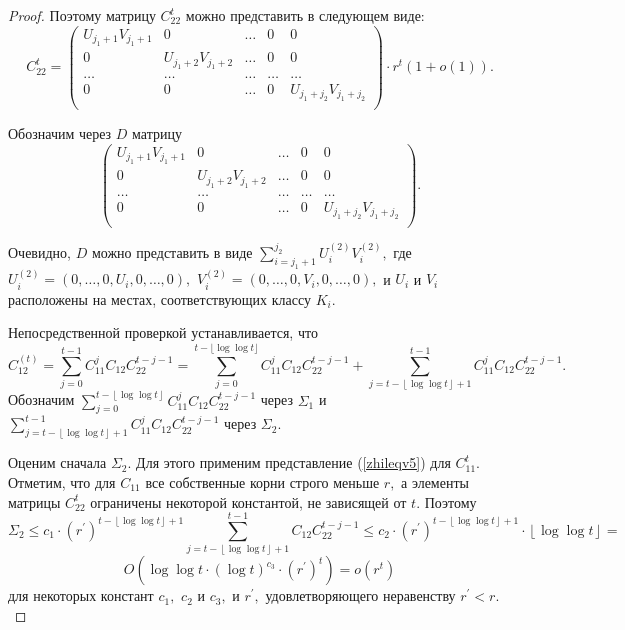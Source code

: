 \documentclass[10pt]{article}
\begin{document}
\begin{proof}
Поэтому матрицу $C_{22}^t$ можно представить в следующем виде:
\
\begin{equation}\label{zhileqv6}
C_{22}^t=
\left(
\begin{array}{ccccc} 
U_{j_1+1} V_{j_1+1} & 0 & \ldots & 0        & 0 \\
0 &    U_{j_1+2} V_{j_1+2} & \ldots & 0 & 0 \\
\ldots & \ldots & \ldots & \ldots &  \ldots \\
0 & 0 &  \ldots & 0 & U_{j_1+j_2} V_{j_1+j_2} \\
\end{array}
\right) \cdot r^t (1+o(1)).
\end{equation}

Обозначим через $D$ матрицу 
$$
\left(
\begin{array}{ccccc} 
U_{j_1+1} V_{j_1+1} & 0 & \ldots & 0        & 0 \\
0 &    U_{j_1+2} V_{j_1+2} & \ldots & 0 & 0 \\
\ldots & \ldots & \ldots & \ldots &  \ldots \\
0 & 0 &  \ldots & 0 & U_{j_1+j_2} V_{j_1+j_2} \\
\end{array}
\right).
$$

Очевидно, $D$ можно представить в виде $\sum^{j_2}_{i=j_1+1}U_i^{(2)}V_i^{(2)},$ где $U_i^{(2)}=(0, \ldots,0,U_i, 0, \ldots,0),$  $V_i^{(2)}=(0, \ldots,0,V_i, 0, \ldots,0),$ и  $U_i$ и $V_i$ расположены на местах, соответствующих классу $K_i.$ 

Непосредственной проверкой устанавливается, что 
$$
C_{12}^{(t)}=\sum_{j=0}^{t-1}C_{11}^{j}C_{12} C_{22}^{t-j-1}=\sum_{j=0}^{t-\lfloor \log \log t \rfloor }C_{11}^{j}C_{12} C_{22}^{t-j-1}+\sum_{j=t-\left\lfloor \log \log t\right\rfloor+1}^{t-1}C_{11}^{j}C_{12} C_{22}^{t-j-1}.
$$
Обозначим $\sum_{j=0}^{t-\left\lfloor \log \log t\right\rfloor}C_{11}^{j}C_{12} C_{22}^{t-j-1}$ через $\Sigma_1$ и $\sum_{j=t-\left\lfloor \log \log t\right\rfloor+1}^{t-1}C_{11}^{j}C_{12} C_{22}^{t-j-1}$ через $\Sigma_2.$

Оценим сначала $\Sigma_2.$ Для этого применим представление (\ref{zhileqv5}) для $C_{11}^{t}.$
Отметим, что для $C_{11}$ все собственные корни строго меньше $r,$ а элементы матрицы $C_{22}^{t}$ ограничены некоторой константой, не зависящей от $t.$
Поэтому
$$
\Sigma_2 \le c_1 \cdot (r^{\prime})^{t-\left\lfloor \log \log t\right\rfloor+1}\sum_{j=t-\left\lfloor \log \log t\right\rfloor+1}^{t-1}C_{12} C_{22}^{t-j-1} \le c_2 \cdot (r^{\prime})^{t-\left\lfloor \log \log t\right\rfloor+1}\cdot \left\lfloor \log \log t\right\rfloor =
$$
$$
O\left(\log \log t \cdot (\log t)^{c_3} \cdot (r^{\prime})^{t}\right)=o \left(r^t\right)
$$
для некоторых констант $c_1,$ $c_2$ и $c_3,$ и $r^{\prime},$ удовлетворяющего неравенству $r^{\prime}<r.$


\end{proof}
\end{document}
